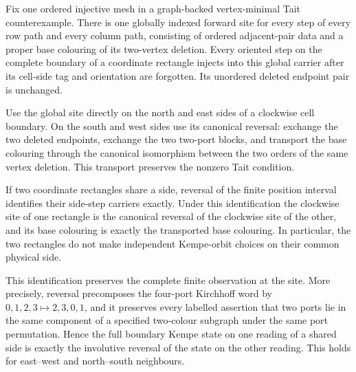 \begin{lemma}
Fix one ordered injective mesh in a graph-backed vertex-minimal Tait
counterexample.  There is one globally indexed forward site for every step of
every row path and every column path, consisting of ordered adjacent-pair data
and a proper base colouring of its two-vertex deletion.  Every oriented step
on the complete boundary of a coordinate rectangle injects into this global
carrier after its cell-side tag and orientation are forgotten.  Its unordered
deleted endpoint pair is unchanged.

Use the global site directly on the north and east sides of a clockwise cell
boundary.  On the south and west sides use its canonical reversal: exchange
the two deleted endpoints, exchange the two two-port blocks, and transport the
base colouring through the canonical isomorphism between the two orders of
the same vertex deletion.  This transport preserves the nonzero Tait
condition.

If two coordinate rectangles share a side, reversal of the finite position
interval identifies their side-step carriers exactly.  Under this
identification the clockwise site of one rectangle is the canonical reversal
of the clockwise site of the other, and its base colouring is exactly the
transported base colouring.  In particular, the two rectangles do not make
independent Kempe-orbit choices on their common physical side.

This identification preserves the complete finite observation at the site.
More precisely, reversal precomposes the four-port Kirchhoff word by
\(0,1,2,3\mapsto2,3,0,1\), and it preserves every labelled assertion that two
ports lie in the same component of a specified two-colour subgraph under the
same port permutation.  Hence the full boundary Kempe state on one reading of
a shared side is exactly the involutive reversal of the state on the other
reading.  This holds for east--west and north--south neighbours.


\end{lemma}
